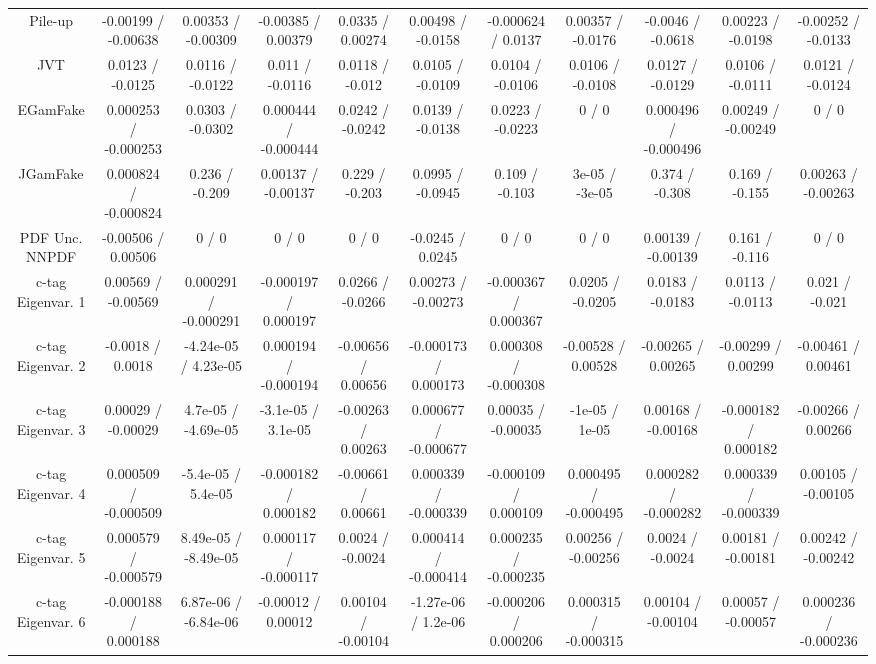 \begin{table}[htbp]
\begin{center}
\begin{tabular}{|c|c|c|c|c|c|c|c|c|c|c|}
  Pile-up & -0.00199 / -0.00638 & 0.00353 / -0.00309 & -0.00385 / 0.00379 & 0.0335 / 0.00274 & 0.00498 / -0.0158 & -0.000624 / 0.0137 & 0.00357 / -0.0176 & -0.0046 / -0.0618 & 0.00223 / -0.0198 & -0.00252 / -0.0133 \\ 
  JVT & 0.0123 / -0.0125 & 0.0116 / -0.0122 & 0.011 / -0.0116 & 0.0118 / -0.012 & 0.0105 / -0.0109 & 0.0104 / -0.0106 & 0.0106 / -0.0108 & 0.0127 / -0.0129 & 0.0106 / -0.0111 & 0.0121 / -0.0124 \\ 
  EGamFake & 0.000253 / -0.000253 & 0.0303 / -0.0302 & 0.000444 / -0.000444 & 0.0242 / -0.0242 & 0.0139 / -0.0138 & 0.0223 / -0.0223 & 0 / 0 & 0.000496 / -0.000496 & 0.00249 / -0.00249 & 0 / 0 \\ 
  JGamFake & 0.000824 / -0.000824 & 0.236 / -0.209 & 0.00137 / -0.00137 & 0.229 / -0.203 & 0.0995 / -0.0945 & 0.109 / -0.103 & 3e-05 / -3e-05 & 0.374 / -0.308 & 0.169 / -0.155 & 0.00263 / -0.00263 \\ 
  PDF Unc. NNPDF & -0.00506 / 0.00506 & 0 / 0 & 0 / 0 & 0 / 0 & -0.0245 / 0.0245 & 0 / 0 & 0 / 0 & 0.00139 / -0.00139 & 0.161 / -0.116 & 0 / 0 \\ 
  c-tag Eigenvar. 1 & 0.00569 / -0.00569 & 0.000291 / -0.000291 & -0.000197 / 0.000197 & 0.0266 / -0.0266 & 0.00273 / -0.00273 & -0.000367 / 0.000367 & 0.0205 / -0.0205 & 0.0183 / -0.0183 & 0.0113 / -0.0113 & 0.021 / -0.021 \\ 
  c-tag Eigenvar. 2 & -0.0018 / 0.0018 & -4.24e-05 / 4.23e-05 & 0.000194 / -0.000194 & -0.00656 / 0.00656 & -0.000173 / 0.000173 & 0.000308 / -0.000308 & -0.00528 / 0.00528 & -0.00265 / 0.00265 & -0.00299 / 0.00299 & -0.00461 / 0.00461 \\ 
  c-tag Eigenvar. 3 & 0.00029 / -0.00029 & 4.7e-05 / -4.69e-05 & -3.1e-05 / 3.1e-05 & -0.00263 / 0.00263 & 0.000677 / -0.000677 & 0.00035 / -0.00035 & -1e-05 / 1e-05 & 0.00168 / -0.00168 & -0.000182 / 0.000182 & -0.00266 / 0.00266 \\ 
  c-tag Eigenvar. 4 & 0.000509 / -0.000509 & -5.4e-05 / 5.4e-05 & -0.000182 / 0.000182 & -0.00661 / 0.00661 & 0.000339 / -0.000339 & -0.000109 / 0.000109 & 0.000495 / -0.000495 & 0.000282 / -0.000282 & 0.000339 / -0.000339 & 0.00105 / -0.00105 \\ 
  c-tag Eigenvar. 5 & 0.000579 / -0.000579 & 8.49e-05 / -8.49e-05 & 0.000117 / -0.000117 & 0.0024 / -0.0024 & 0.000414 / -0.000414 & 0.000235 / -0.000235 & 0.00256 / -0.00256 & 0.0024 / -0.0024 & 0.00181 / -0.00181 & 0.00242 / -0.00242 \\ 
  c-tag Eigenvar. 6 & -0.000188 / 0.000188 & 6.87e-06 / -6.84e-06 & -0.00012 / 0.00012 & 0.00104 / -0.00104 & -1.27e-06 / 1.2e-06 & -0.000206 / 0.000206 & 0.000315 / -0.000315 & 0.00104 / -0.00104 & 0.00057 / -0.00057 & 0.000236 / -0.000236 \\ 

\end{tabular}
\end{center}
\end{table}

